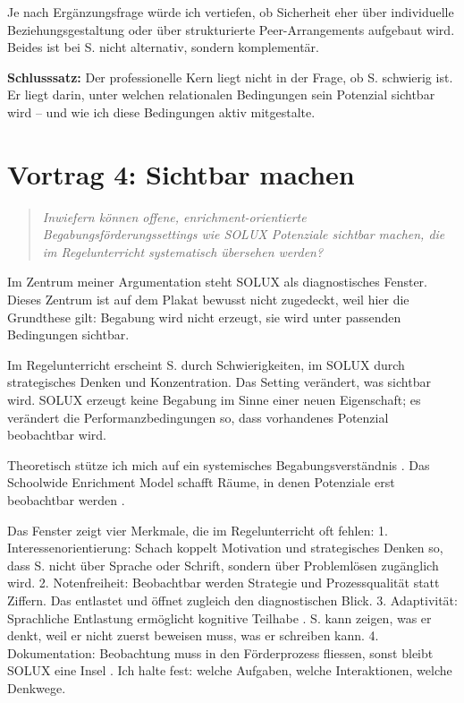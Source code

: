 \documentclass[ngerman, a4paper]{article}
\begin{document}
Je nach Ergänzungsfrage würde ich vertiefen, ob Sicherheit eher über
individuelle Beziehungsgestaltung oder über strukturierte Peer-Arrangements
aufgebaut wird. Beides ist bei S. nicht alternativ, sondern komplementär.

\textbf{Schlusssatz:} Der professionelle Kern liegt nicht in der Frage, ob S.
schwierig ist. Er liegt darin, unter welchen relationalen Bedingungen sein
Potenzial sichtbar wird -- und wie ich diese Bedingungen aktiv mitgestalte.

\newpage

\section{Vortrag 4: Sichtbar machen}
\label{sec:vortrag4}

\begin{quote}\itshape
Inwiefern können offene, enrichment-orientierte Begabungsförderungssettings wie
SOLUX Potenziale sichtbar machen, die im Regelunterricht systematisch übersehen
werden?
\end{quote}

Im Zentrum meiner Argumentation steht SOLUX als diagnostisches Fenster. Dieses
Zentrum ist auf dem Plakat bewusst nicht zugedeckt, weil hier die Grundthese
gilt: Begabung wird nicht erzeugt, sie wird unter passenden Bedingungen
sichtbar.

Im Regelunterricht erscheint S. durch Schwierigkeiten, im SOLUX durch
strategisches Denken und Konzentration. Das Setting verändert, was sichtbar
wird. SOLUX erzeugt keine Begabung im Sinne einer neuen Eigenschaft; es
verändert die Performanzbedingungen so, dass vorhandenes Potenzial beobachtbar
wird.

Theoretisch stütze ich mich auf ein systemisches Begabungsverständnis
\parencites{hoyer2013begabung}{muelleroppliger2021begabungsmodelle}. Das
Schoolwide Enrichment Model schafft Räume, in denen Potenziale erst beobachtbar
werden \parencite{reisrenzullimueller2021sem}.

Das Fenster zeigt vier Merkmale, die im Regelunterricht oft fehlen:
1. Interessenorientierung: Schach koppelt Motivation und strategisches Denken
so, dass S. nicht über Sprache oder Schrift, sondern über Problemlösen
zugänglich wird.
2. Notenfreiheit: Beobachtbar werden Strategie und Prozessqualität statt
Ziffern. Das entlastet und öffnet zugleich den diagnostischen Blick.
3. Adaptivität: Sprachliche Entlastung ermöglicht kognitive Teilhabe
\parencite{muelleroppliger2021adaptive}. S. kann zeigen, was er denkt, weil er
nicht zuerst beweisen muss, was er schreiben kann.
4. Dokumentation: Beobachtung muss in den Förderprozess fliessen, sonst bleibt
SOLUX eine Insel \parencite{muelleroppliger2021paeddiagnostik}. Ich halte
fest: welche Aufgaben, welche Interaktionen, welche Denkwege.
\end{document}
